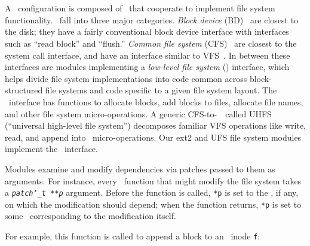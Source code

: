 
\section{\Modules}
\label{sec:modules}

A \Kudos\ configuration is composed of \modules\ that cooperate to
 implement file system functionality.
%
\Modules\ fall into three major categories.
%
\emph{Block device} (BD) \modules\ are closest to the disk; they have a fairly
conventional block device interface with interfaces such as ``read block'' and
``flush.''
%
\emph{Common file system} (CFS) \modules\ are closest to the system call
interface, and have an interface similar to VFS~\cite{kleiman86vnodes}. 
%
In between these interfaces are modules implementing a  \emph{low-level file
system} (\LFS) interface, which helps divide file system implementations
into code common across block-structured file systems and code specific to
a given file system layout.
%
The \LFS\ interface has functions to allocate blocks, add blocks to files,
allocate file names, and other file system micro-operations. 
A generic CFS-to-\LFS\ \module\ called UHFS
(``universal high-level file system'') decomposes familiar VFS operations
like write, read, and append into \LFS\ micro-operations. 
%
%
Our ext2 and UFS file system modules
implement the \LFS\ interface.


Modules examine and modify dependencies via patches passed to them as
arguments.
%
For instance, every \LFS\ function that might modify the file system takes a
\texttt{\textit{patch\char`\_t **p}} argument.
%
Before the function is called, \texttt{*p} is set to the \patch,
if any, on which the modification should depend;
%
when the function returns, \texttt{*p} is set to some \patch\
corresponding to the modification itself.
%
\begin{comment}
(\Noop\ \patches\ allow this interface to generalize to multiple
dependencies.)
\end{comment}
%
For example, this function is called to append a block to an \LFS\ inode
\verb+f+:


